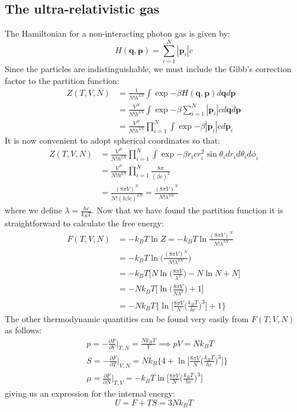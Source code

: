 \documentclass[a4paper,11pt,oneside]{book}
\begin{document}
\subsection{The ultra-relativistic gas}
The Hamiltonian for a non-interacting photon gas is given by:
\begin{equation}
    H(\textbf{q},\textbf{p}) =\sum_{i=1}^N |\textbf{p}_i|c
\end{equation}
Since the particles are indistinguishable, we must include the Gibb's correction factor to the partition function:
\begin{align}
    Z(T,V,N) &= \frac{1}{N! h^{3N}} \int \exp{-\beta H(\textbf{q},\textbf{p})} d\textbf{q}d\textbf{p}\\
    &=\frac{V^N}{N! h^{3N}} \int \exp{-\beta \sum_{i=1}^N |\textbf{p}_i|c} d\textbf{q}d\textbf{p}\\
    &= \frac{V^N}{N!h^{3N}} \prod_{i=1}^N \int \exp{-\beta |\textbf{p}_i|c} d\textbf{p}_i
\end{align}
It is now convenient to adopt spherical coordinates so that:
\begin{align}
    Z(T,V,N) &= \frac{V^N}{N!h^{3N}} \prod_{i=1}^N \int \exp{-\beta r_ic} r_i^2 \sin \theta_i dr_i d\theta_i d\phi_i\\
    &=\frac{V^N}{N!h^{3N}} \prod_{i=1}^N \frac{8\pi}{(\beta c)^3}\\
    &= \frac{(8\pi V)^N}{N!(h \beta c)^{3N}}=\frac{(8\pi V)^N}{N!\lambda^{3N}} 
\end{align}
where we define $\lambda = \frac{hc}{k_B T}$. Now that we have found the partition function it is straightforward to calculate the free energy:
\begin{align}
    F(T,V,N) &= -k_B T \ln Z = -k_B T \ln \frac{(8\pi V)^N}{N!\lambda^{3N}} \\
    &=-k_B T \ln \bigg(\frac{(8\pi V)^N}{N!\lambda^{3N}}\bigg)\\
    &=-k_BT\bigg[N \ln \bigg(\frac{8\pi V}{\lambda^3}\bigg) - N \ln N + N\bigg]\\
    &=-Nk_B T\bigg[\ln \bigg(\frac{8 \pi V}{N \lambda^3}\bigg)+1\bigg]\\
    &=-Nk_B T\bigg\{\ln \bigg[\frac{8 \pi V}{N}\bigg(\frac{k_B T}{hc}\bigg)^3\bigg]+1\bigg\}
\end{align}
The other thermodynamic quantities can be found very easily from $F(T,V,N)$ as follows:
\begin{align}
    &p = -\frac{\partial F}{\partial V}\bigg|_{T,N} = \frac{Nk_B T}{V} \implies pV = Nk_B T\\
    &S = -\frac{\partial F}{\partial T}\bigg|_{V,N} = Nk_B \bigg\{4+ \ln \bigg[\frac{8 \pi V}{N}\bigg(\frac{k_B T}{hc}\bigg)^3\bigg]\bigg\}\\
    &\mu = \frac{\partial F}{\partial N}\bigg|_{T,V} = -k_B T \ln \bigg[\frac{8 \pi V}{N}\bigg(\frac{k_B T}{hc}\bigg)^3\bigg]
\end{align}
giving us an expression for the internal energy:
\begin{equation}
    U = F+TS=3Nk_BT
\end{equation}
\end{document}
